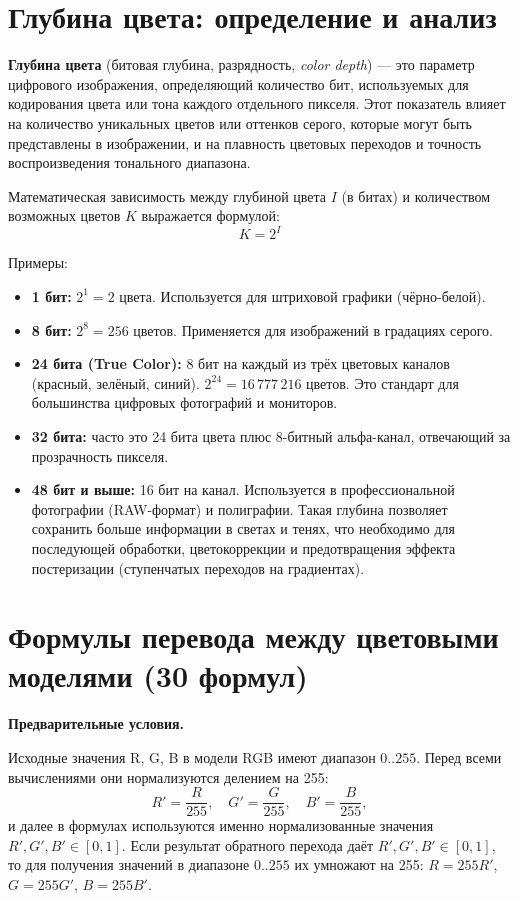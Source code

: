 \documentclass[12pt,a4paper]{article}
\begin{document}
\section{Глубина цвета: определение и анализ}

\textbf{Глубина цвета} (битовая глубина, разрядность, \textit{color depth}) --- это параметр цифрового изображения, определяющий количество бит, используемых для кодирования цвета или тона каждого отдельного пикселя. Этот показатель влияет на количество уникальных цветов или оттенков серого, которые могут быть представлены в изображении, и на плавность цветовых переходов и точность воспроизведения тонального диапазона.

Математическая зависимость между глубиной цвета \(I\) (в битах) и количеством возможных цветов \(K\) выражается формулой:
\[
K = 2^I
\]

Примеры:
\begin{itemize}
    \item \textbf{1 бит:} \(2^1 = 2\) цвета. Используется для штриховой графики (чёрно-белой).
    \item \textbf{8 бит:} \(2^8 = 256\) цветов. Применяется для изображений в градациях серого.
    \item \textbf{24 бита (True Color):} 8 бит на каждый из трёх цветовых каналов (красный, зелёный, синий). \(2^{24} = 16\,777\,216\) цветов. Это стандарт для большинства цифровых фотографий и мониторов.
    \item \textbf{32 бита:} часто это 24 бита цвета плюс 8-битный альфа-канал, отвечающий за прозрачность пикселя.
    \item \textbf{48 бит и выше:} 16 бит на канал. Используется в профессиональной фотографии (RAW-формат) и полиграфии. Такая глубина позволяет сохранить больше информации в светах и тенях, что необходимо для последующей обработки, цветокоррекции и предотвращения эффекта постеризации (ступенчатых переходов на градиентах).
\end{itemize}

\section{Формулы перевода между цветовыми моделями (30 формул)}

\textbf{Предварительные условия.}

Исходные значения R, G, B в модели RGB имеют диапазон \(0..255\). Перед всеми вычислениями они нормализуются делением на 255:
\[
R' = \frac{R}{255},\quad G' = \frac{G}{255},\quad B' = \frac{B}{255},
\]
и далее в формулах используются именно нормализованные значения \(R', G', B' \in [0, 1]\). Если результат обратного перехода даёт \(R', G', B' \in [0, 1]\), то для получения значений в диапазоне \(0..255\) их умножают на 255: \(R = 255 R'\), \(G = 255 G'\), \(B = 255 B'\).
\end{document}
